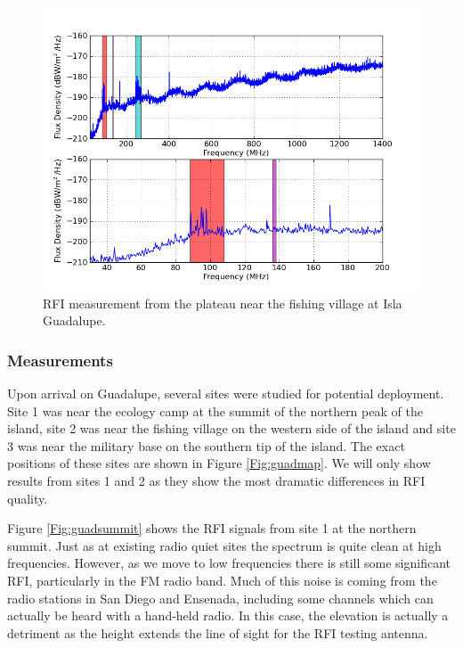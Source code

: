 \begin{figure}[htb]
\begin{center}
\includegraphics[width=0.9\linewidth]{RFI_testing/figures/GI_2__bands.png}
\caption{RFI measurement from the plateau near the fishing village at Isla Guadalupe.}
\label{Fig:guadlow}
\end{center}
\end{figure}

\subsubsection{Measurements}

Upon arrival on Guadalupe, several sites were studied for potential deployment. Site 1 was near the ecology camp at the summit of the northern peak of the island, site 2 was near the fishing village on the western side of the island and site 3 was near the military base on the southern tip of the island. The exact positions of these sites are shown in Figure \ref{Fig:guadmap}. We will only show results from sites 1 and 2 as they show the most dramatic differences in RFI quality. 

Figure \ref{Fig:guadsummit} shows the RFI signals from site 1 at the northern summit. Just as at existing radio quiet sites the spectrum is quite clean at high frequencies. However, as we move to low frequencies there is still some significant RFI, particularly in the FM radio band. Much of this noise is coming from the radio stations in San Diego and Ensenada, including some channels which can actually be heard with a hand-held radio. In this case, the elevation is actually a detriment as the height extends the line of sight for the RFI testing antenna. 

